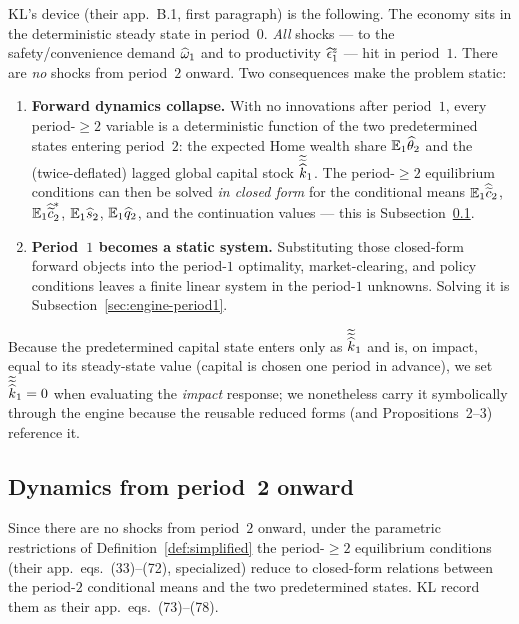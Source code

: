 KL's device (their app.~B.1, first paragraph) is the following. The economy sits
in the deterministic steady state in period~$0$. \emph{All} shocks ---
to the safety/convenience demand $\widehat{\omega}_1$ and to productivity $\widehat{\epsilon}^z_1$ ---
hit in period~$1$. There are \emph{no} shocks from period~$2$ onward. Two
consequences make the problem static:
\begin{enumerate}[leftmargin=1.6em,itemsep=2pt]
  \item \textbf{Forward dynamics collapse.} With no innovations after period~$1$,
  every period-$\ge2$ variable is a deterministic function of the two
  predetermined states entering period~$2$: the expected Home wealth share
  $\mathbb{E}_1\widehat{\theta}_2$ and the (twice-deflated) lagged global capital stock
  $\widetilde{\widetilde{\widehat{k}}}_1$. The period-$\ge2$ equilibrium conditions
  can then be solved \emph{in closed form} for the conditional means
  $\mathbb{E}_1\widehat{\widetilde{c}}_2$, $\mathbb{E}_1\widehat{\widetilde{c}}^{*}_2$, $\mathbb{E}_1\widehat{s}_2$,
  $\mathbb{E}_1\widehat{q}_2$, and the continuation values --- this is
  Subsection~\ref{sec:engine-period2}.
  \item \textbf{Period~$1$ becomes a static system.} Substituting those
  closed-form forward objects into the period-$1$ optimality, market-clearing,
  and policy conditions leaves a finite linear system in the period-$1$
  unknowns. Solving it is Subsection~\ref{sec:engine-period1}.
\end{enumerate}
Because the predetermined capital state enters only as
$\widetilde{\widetilde{\widehat{k}}}_1$ and is, on impact, equal to its steady-state
value (capital is chosen one period in advance), we set
$\widetilde{\widetilde{\widehat{k}}}_1=0$ when evaluating the \emph{impact} response;
we nonetheless carry it symbolically through the engine because the reusable
reduced forms (and Propositions~2--3) reference it.

\subsection{Dynamics from period~2 onward}
\label{sec:engine-period2}

Since there are no shocks from period~$2$ onward, under the parametric
restrictions of Definition~\ref{def:simplified} the period-$\ge2$ equilibrium
conditions (their app.~eqs.~(33)--(72), specialized) reduce to closed-form
relations between the period-$2$ conditional means and the two predetermined
states. KL record them as their app.~eqs.~(73)--(78).

